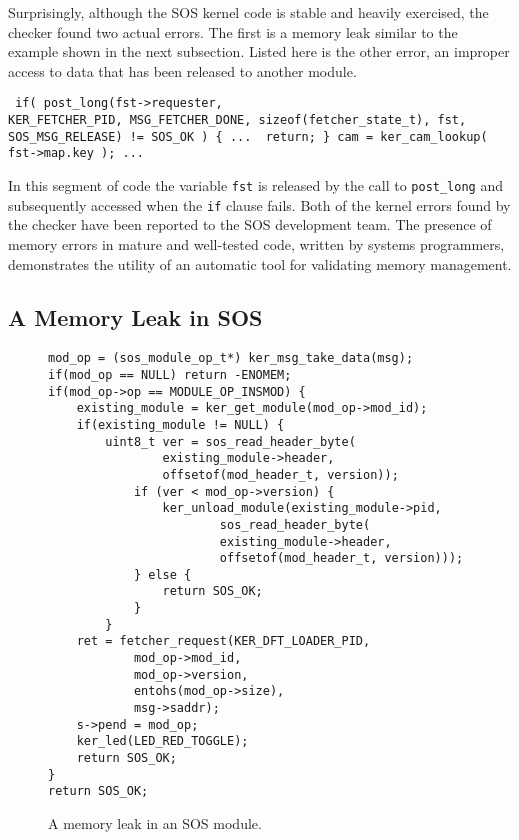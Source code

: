 Surprisingly, although the SOS kernel code is stable and heavily
exercised, the checker found two actual errors.  The first is a memory
leak similar to the example shown in the next subsection.  Listed here
is the other error, an improper access to data that has been released
to another module.
%
\begin{footnotesize} \begin{verbatim} if( post_long(fst->requester,
KER_FETCHER_PID, MSG_FETCHER_DONE, sizeof(fetcher_state_t), fst,
SOS_MSG_RELEASE) != SOS_OK ) { ...  return; } cam = ker_cam_lookup(
fst->map.key ); ...  \end{verbatim} \end{footnotesize}
%
In this segment of code the variable {\tt fst} is released by the call
to {\tt post\_long} and subsequently accessed when the {\tt if} clause
fails.  Both of the kernel errors found by the checker have been
reported to the SOS development team.  The presence of memory errors
in mature and well-tested code, written by systems programmers,
demonstrates the utility of an automatic tool for validating memory
management.




\subsection{A Memory Leak in SOS}
\label{ss:tale}

\begin{figure}[tp]
\begin{footnotesize}
\begin{verbatim}
mod_op = (sos_module_op_t*) ker_msg_take_data(msg);
if(mod_op == NULL) return -ENOMEM;
if(mod_op->op == MODULE_OP_INSMOD) {
    existing_module = ker_get_module(mod_op->mod_id);
    if(existing_module != NULL) {
        uint8_t ver = sos_read_header_byte(
                existing_module->header,
                offsetof(mod_header_t, version));
            if (ver < mod_op->version) {
                ker_unload_module(existing_module->pid, 
                        sos_read_header_byte(
                        existing_module->header,
                        offsetof(mod_header_t, version)));
            } else {
                return SOS_OK;
            }
        }
    ret = fetcher_request(KER_DFT_LOADER_PID,
            mod_op->mod_id,
            mod_op->version,
            entohs(mod_op->size),
            msg->saddr);
    s->pend = mod_op;
    ker_led(LED_RED_TOGGLE);
    return SOS_OK;
}
return SOS_OK;
\end{verbatim}
\end{footnotesize}
\label{fig:leak}
\caption{A memory leak in an SOS module.}
\end{figure}

